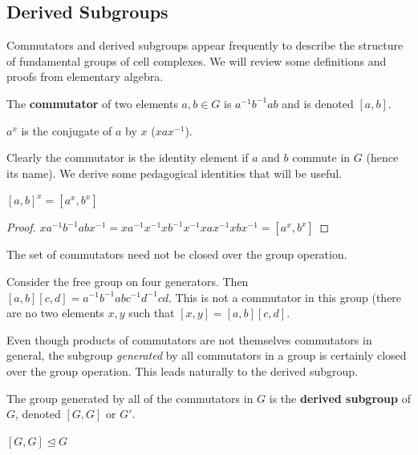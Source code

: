 \documentclass[10pt]{article}
\begin{document}
\subsection{Derived Subgroups}

Commutators and derived subgroups appear frequently to describe the structure
of fundamental groups of cell complexes. We will review some definitions and
proofs from elementary algebra.

\begin{definition}
	The \textbf{commutator} of two elements $a, b \in G$ is $a^{-1}b^{-1}ab$ and
	is denoted $[a, b]$.
\end{definition}

\begin{definition}
	$a^x$ is the conjugate of $a$ by $x$ ($xax^{-1}$).
\end{definition}

Clearly the commutator is the identity element if $a$ and $b$ commute in $G$
(hence its name). We derive some pedagogical identities that will be useful.

\begin{definition}
	$[a, b]^x = [a^x,b^x]$
\end{definition}
\begin{proof}
	$xa^{-1}b^{-1}abx^{-1} = xa^{-1}x^{-1}xb^{-1}x^{-1}xax^{-1}xbx^{-1} = [a^x,b^x]$
\end{proof}

\begin{note}
	The set of commutators need not be closed over the group operation.

	Consider the free group on four generators. Then $[a, b][c, d] =
	a^{-1}b^{-1}abc^{-1}d^{-1}cd$. This is not a commutator in this group (there
	are no two elements $x, y$ such that $[x, y] = [a, b][c, d]$.
\end{note}

Even though products of commutators are not themselves commutators in general,
the subgroup \textit{generated} by all commutators in a group is certainly closed over
the group operation. This leads naturally to the derived subgroup.

\begin{definition}
	The group generated by all of the commutators in $G$ is the \textbf{derived
	subgroup} of $G$, denoted $[G, G]$ or $G'$.
\end{definition}

\begin{theorem}
	$[G, G] \trianglelefteq G$
\end{theorem}
\end{document}
